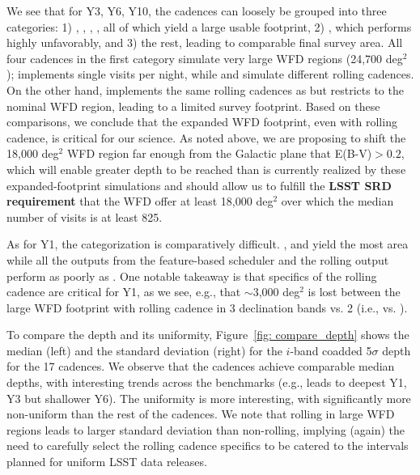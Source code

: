 We see that for Y3, Y6, Y10, the cadences can loosely be grouped into three categories: 1) , , , , all of which yield a large usable footprint, 2) , which performs highly unfavorably, and 3) the rest, leading to comparable final survey area.  All four cadences in the first category simulate very large WFD regions (24,700 deg$^2$);  implements single visits per night, while  and  simulate different rolling cadences. On the other hand,  implements the same rolling cadences as   but restricts to the nominal WFD region, leading to a limited survey footprint. Based on these comparisons, we conclude that the expanded WFD footprint, even with rolling cadence, is critical for our science.  As noted above, we are proposing to shift the 18,000 deg$^2$ WFD region far enough from the Galactic plane that E(B-V)$>0.2$, which will enable greater depth to be reached than is currently realized by these expanded-footprint simulations and should allow us to fulfill the {\bf LSST SRD requirement} that the WFD offer at least 18,000 deg$^2$ over which the median number of visits is at least 825.

As for Y1, the categorization is comparatively difficult.  ,  and  yield the most area while all the outputs from the feature-based scheduler and the rolling   output perform as poorly as . One notable takeaway is that specifics of the rolling cadence are critical for Y1, as we see, e.g., that $\sim$3,000 deg$^2$ is lost between the large WFD footprint with rolling cadence in 3 declination bands vs. 2 (i.e.,  vs. ).

To compare the depth and its uniformity, Figure~\ref{fig: compare_depth} shows the median (left) and the standard deviation (right) for the $i$-band coadded 5$\sigma$ depth for the 17 cadences. We observe that the cadences achieve comparable median depths, with interesting trends across the benchmarks  (e.g.,  leads to deepest Y1, Y3 but shallower Y6). The uniformity is more interesting, with  significantly more non-uniform than the rest of the cadences. We note that rolling in large WFD regions leads to larger standard deviation than non-rolling, implying (again) the need to carefully select the rolling cadence specifics to be catered to the intervals planned for uniform LSST data releases.

